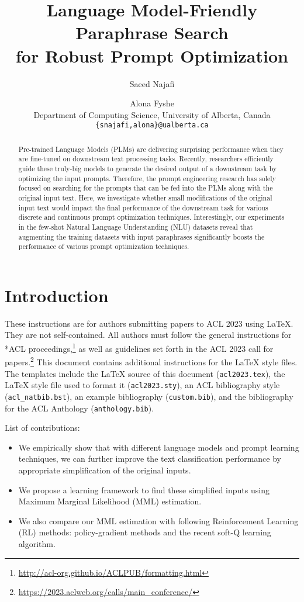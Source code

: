 \documentclass[11pt]{article}
\title{Language Model-Friendly Paraphrase Search \\ for Robust Prompt Optimization}
\author{Saeed Najafi \and
  Alona Fyshe \\
  Department of Computing Science, University of Alberta, Canada\\
  \texttt{\{snajafi,alona\}@ualberta.ca} \\}
\begin{document}
\maketitle
\begin{abstract}
Pre-trained Language Models (PLMs) are delivering surprising performance when they are fine-tuned on downstream text processing tasks. Recently, researchers efficiently guide these truly-big models to generate the desired output of a downstream task by optimizing the input prompts. Therefore, the prompt engineering research has solely focused on searching for the prompts that can be fed into the PLMs along with the original input text. Here, we investigate whether small modifications of the original input text would impact the final performance of the downstream task for various discrete and continuous prompt optimization techniques. Interestingly, our experiments in the few-shot Natural Language Understanding (NLU) datasets reveal that augmenting the training datasets with input paraphrases significantly boosts the performance of various prompt optimization techniques.
\end{abstract}

\section{Introduction}

These instructions are for authors submitting papers to ACL 2023 using \LaTeX. They are not self-contained. All authors must follow the general instructions for *ACL proceedings,\footnote{\url{http://acl-org.github.io/ACLPUB/formatting.html}} as well as guidelines set forth in the ACL 2023 call for papers.\footnote{\url{https://2023.aclweb.org/calls/main_conference/}} This document contains additional instructions for the \LaTeX{} style files.
The templates include the \LaTeX{} source of this document (\texttt{acl2023.tex}),
the \LaTeX{} style file used to format it (\texttt{acl2023.sty}),
an ACL bibliography style (\texttt{acl\_natbib.bst}),
an example bibliography (\texttt{custom.bib}),
and the bibliography for the ACL Anthology (\texttt{anthology.bib}).

List of contributions:
\begin{itemize}
    \item We empirically show that with different language models and prompt learning techniques, we can further improve the text classification performance by appropriate simplification of the original inputs.
    \item We propose a learning framework to find these simplified inputs using Maximum Marginal Likelihood (MML) estimation.
    \item We also compare our MML estimation with following Reinforcement Learning (RL) methods: policy-gradient methods and the recent soft-Q learning algorithm.
\end{itemize}
\end{document}
